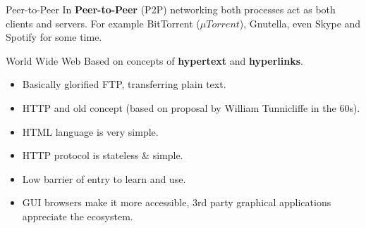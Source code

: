\begin{sidenotebox}{Peer-to-Peer}
    In \textbf{Peer-to-Peer} (P2P) networking both processes act as both clients and servers. For example BitTorrent ($\mu Torrent$), Gnutella, even Skype and Spotify for some time.
\end{sidenotebox}
\begin{sidenotebox}{World Wide Web}
    Based on concepts of \textbf{hypertext} and \textbf{hyperlinks}.
    \begin{itemize}
        \setlength\itemsep{0em}
        \item Basically glorified FTP, transferring plain text.
        \item HTTP and old concept (based on proposal by William Tunnicliffe in the 60s).
        \item HTML language is very simple.
        \item HTTP protocol is stateless \& simple.
        \item Low barrier of entry to learn and use.
        \item GUI browsers make it more accessible, 3rd party graphical applications appreciate the ecosystem.
    \end{itemize}
\end{sidenotebox}

